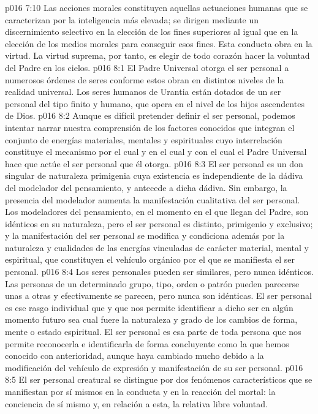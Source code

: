 \vs p016 7:10 Las acciones morales constituyen aquellas actuaciones humanas que se caracterizan por la inteligencia más elevada; se dirigen mediante un discernimiento selectivo en la elección de los fines superiores al igual que en la elección de los medios morales para conseguir esos fines. Esta conducta obra en la virtud. La virtud suprema, por tanto, es elegir de todo corazón hacer la voluntad del Padre en los cielos.
\vs p016 8:1 El Padre Universal otorga el ser personal a numerosos órdenes de seres conforme estos obran en distintos niveles de la realidad universal. Los seres humanos de Urantia están dotados de un ser personal del tipo finito y humano, que opera en el nivel de los hijos ascendentes de Dios.
\vs p016 8:2 Aunque es difícil pretender definir el ser personal, podemos intentar narrar nuestra comprensión de los factores conocidos que integran el conjunto de energías materiales, mentales y espirituales cuyo interrelación constituye el mecanismo por el cual y en el cual y con el cual el Padre Universal hace que actúe el ser personal que él otorga.
\vs p016 8:3 El ser personal es un don singular de naturaleza primigenia cuya existencia es independiente de la dádiva del modelador del pensamiento, y antecede a dicha dádiva. Sin embargo, la presencia del modelador aumenta la manifestación cualitativa del ser personal. Los modeladores del pensamiento, en el momento en el que llegan del Padre, son idénticos en su naturaleza, pero el ser personal es distinto, primigenio y exclusivo; y la manifestación del ser personal se modifica y condiciona además por la naturaleza y cualidades de las energías vinculadas de carácter material, mental y espiritual, que constituyen el vehículo orgánico por el que se manifiesta el ser personal.
\vs p016 8:4 Los seres personales pueden ser similares, pero nunca idénticos. Las personas de un determinado grupo, tipo, orden o patrón pueden parecerse unas a otras y efectivamente se parecen, pero nunca son idénticas. El ser personal es ese rasgo individual que  y que nos permite identificar a dicho ser en algún momento futuro sea cual fuere la naturaleza y grado de los cambios de forma, mente o estado espiritual. El ser personal es esa parte de toda persona que nos permite reconocerla e identificarla de forma concluyente como la que hemos conocido con anterioridad, aunque haya cambiado mucho debido a la modificación del vehículo de expresión y manifestación de su ser personal.
\vs p016 8:5 \pc El ser personal creatural se distingue por dos fenómenos característicos que se manifiestan por sí mismos en la conducta y en la reacción del mortal: la conciencia de sí mismo y, en relación a esta, la relativa libre voluntad.
